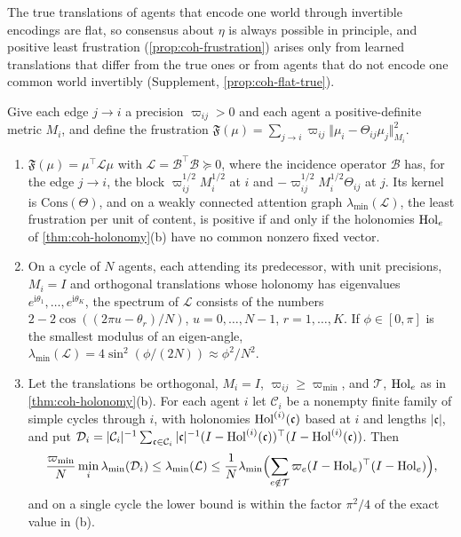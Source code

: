 The true translations of agents that encode one world through invertible encodings are flat, so consensus about $\eta$ is always possible in principle, and positive least frustration (\cref{prop:coh-frustration}) arises only from learned translations that differ from the true ones or from agents that do not encode one common world invertibly (Supplement, \cref{prop:coh-flat-true}).

\begin{proposition}[Frustration]\label{prop:coh-frustration}
Give each edge $j\to i$ a precision $\varpi_{ij}>0$ and each agent a positive-definite metric $M_i$, and define the frustration $\mathfrak F(\mu)=\sum_{j\to i}\varpi_{ij}\Vert\mu_i-\Theta_{ij}\mu_j\Vert^2_{M_i}$.
\begin{enumerate}\renewcommand{\labelenumi}{(\alph{enumi})}
\item $\mathfrak F(\mu)=\mu^\top\mathcal L\mu$ with $\mathcal L=\mathcal B^\top\mathcal B\succeq0$, where the incidence operator $\mathcal B$ has, for the edge $j\to i$, the block $\varpi_{ij}^{1/2}M_i^{1/2}$ at $i$ and $-\varpi_{ij}^{1/2}M_i^{1/2}\Theta_{ij}$ at $j$. Its kernel is $\mathrm{Cons}(\Theta)$, and on a weakly connected attention graph $\lambda_{\min}(\mathcal L)$, the least frustration per unit of content, is positive if and only if the holonomies $\operatorname{Hol}_e$ of \cref{thm:coh-holonomy}(b) have no common nonzero fixed vector.
\item On a cycle of $N$ agents, each attending its predecessor, with unit precisions, $M_i=I$ and orthogonal translations whose holonomy has eigenvalues $e^{\mathrm i\theta_1},\dots,e^{\mathrm i\theta_K}$, the spectrum of $\mathcal L$ consists of the numbers $2-2\cos((2\pi u-\theta_r)/N)$, $u=0,\dots,N-1$, $r=1,\dots,K$. If $\phi\in[0,\pi]$ is the smallest modulus of an eigen-angle, $\lambda_{\min}(\mathcal L)=4\sin^2(\phi/(2N))\approx\phi^2/N^2$.
\item Let the translations be orthogonal, $M_i=I$, $\varpi_{ij}\ge\varpi_{\min}$, and $\mathcal T$, $\operatorname{Hol}_e$ as in \cref{thm:coh-holonomy}(b). For each agent $i$ let $\mathcal C_i$ be a nonempty finite family of simple cycles through $i$, with holonomies $\operatorname{Hol}^{(i)}(\mathfrak c)$ based at $i$ and lengths $|\mathfrak c|$, and put $\mathcal D_i=|\mathcal C_i|^{-1}\sum_{\mathfrak c\in\mathcal C_i}|\mathfrak c|^{-1}(I-\operatorname{Hol}^{(i)}(\mathfrak c))^\top(I-\operatorname{Hol}^{(i)}(\mathfrak c))$. Then
\[ \frac{\varpi_{\min}}{N}\min_i\lambda_{\min}(\mathcal D_i)\le\lambda_{\min}(\mathcal L)\le\frac1N\lambda_{\min}\Bigl(\sum_{e\notin\mathcal T}\varpi_e(I-\operatorname{Hol}_e)^\top(I-\operatorname{Hol}_e)\Bigr), \]
and on a single cycle the lower bound is within the factor $\pi^2/4$ of the exact value in (b).
\end{enumerate}
\end{proposition}


